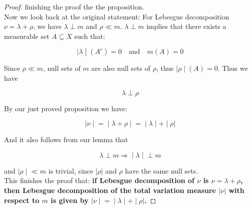 \begin{proof}
finishing the proof the the proposition.\\
Now we look back at the original statement: For Lebesgue decomposition \(\nu = \lambda + \rho\), we have \(\lambda \perp m\) and \(\rho \ll m\). \(\lambda \perp m\) implies that there exists a measurable set \(A \subseteq X\) such that:

\[\left. |\lambda \middle| (A^{c}) = 0\quad\text{and}\quad m(A) = 0 \right.\]

Since \(\rho \ll m\), null sets of \(m\) are also null sets of \(\rho\), thus \(\left. |\rho \middle| (A) = 0 \right.\). Thus we have

\[\lambda \perp \rho\]

By our just proved proposition we have:

\[\left. |\nu \middle| = \middle| \lambda + \rho \middle| = \middle| \lambda \middle| + \middle| \rho| \right.\]

And it also follows from our lemma that

\[\left. \lambda \perp m\Longrightarrow \middle| \lambda \middle| \perp m \right.\]

and \(\left. |\rho \middle| \ll m \right.\) is trivial, since \(|\rho|\) and \(\rho\) have the same null sets.\\
This finishes the proof that: \textbf{if Lebesgue decomposition of \(\nu\) is \(\nu = \lambda + \rho\), then Lebesgue decomposition of the total variation measure \(|\nu|\) with respect to \(m\) is given by \(\left. |\nu \middle| = \middle| \lambda \middle| + \middle| \rho| \right.\).}

\end{proof}

